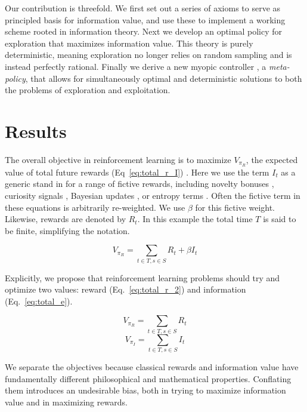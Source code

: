 \documentclass[9pt,twocolumn,twoside]{pnas-new}
\begin{document}
Our contribution is threefold. We first set out a series of axioms to serve as principled basis for information value, and use these to implement a working scheme rooted in information theory. Next we develop an optimal policy for exploration that maximizes information value. This theory is purely deterministic, meaning exploration no longer relies on random sampling and is instead perfectly rational. Finally we derive a new myopic controller \cite{Hocker2017}, a \textit{meta-policy}, that allows for simultaneously optimal and deterministic solutions to both the problems of exploration and exploitation. 


\section*{Results}
The overall objective in reinforcement learning is to maximize $V_{\pi_R}$, the expected value of total future rewards (Eq~\ref{eq:total_r_I}) \cite{Sutton2018}. Here we use the term $I_t$ as a generic stand in for a range of fictive rewards, including novelty bonuses \cite{Kakade2002}, curiosity signals \cite{Pathak2017}, Bayesian updates \cite{Radulescu2019}, or entropy terms \cite{Haarnoja2015,Haarnoja2017}.  Often the fictive term in these equations is arbitrarily re-weighted. We use $\beta$ for this fictive weight. Likewise, rewards are denoted by $R_t$. In this example the total time $T$ is said to be finite, simplifying the notation.

\begin{equation}
    V_{\pi_R} = \sum_{t \in T, s \in S} R_t + \beta I_t
    \label{eq:total_r_I}
\end{equation}

Explicitly, we propose that reinforcement learning problems should try and optimize two values: reward (Eq.~\ref{eq:total_r_2}) and information (Eq.~\ref{eq:total_e}). 

\begin{multicols}{2}
  \begin{equation}
    V_{\pi_R} = \sum_{t \in T, s \in S} R_t
    \label{eq:total_r_2}
  \end{equation} \break
  \begin{equation}
    V_{\pi_I} = \sum_{t \in T, s \in S} I_t
    \label{eq:total_e}
  \end{equation}
\end{multicols}

We separate the objectives because classical rewards and information value have fundamentally different philosophical and mathematical properties. Conflating them introduces an undesirable bias, both in trying to maximize information value and in maximizing rewards.
\end{document}
